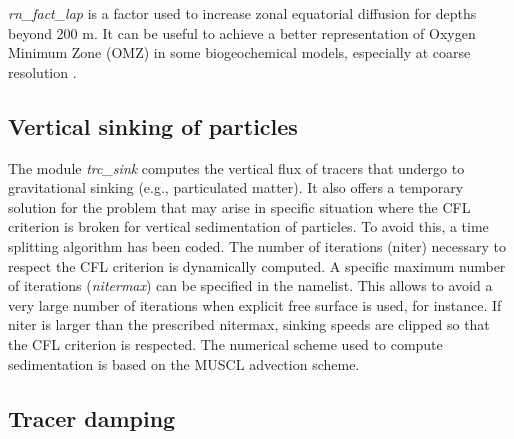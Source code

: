 \documentclass[../main/TOP_manual]{subfiles}
\begin{document}
\textit{rn\_fact\_lap} is a factor used to increase zonal equatorial diffusion for depths beyond 200 m. It can be useful to achieve a better representation of Oxygen Minimum Zone (OMZ) in some biogeochemical models, especially at coarse resolution \citep{getzlaff_2013}.



\subsection{Vertical sinking of particles}

The module \textit{trc\_sink} computes the vertical flux of tracers that undergo to gravitational sinking (e.g., particulated matter). It also offers a temporary solution for the problem that may arise in specific situation where the CFL criterion is broken for vertical sedimentation of particles. To avoid this, a time splitting algorithm has been coded. The number of iterations (niter) necessary to respect the CFL criterion is dynamically computed. A specific maximum number of iterations (\textit{nitermax}) can be specified in the namelist. This allows to avoid a very large number of iterations when explicit free surface is used, for instance. If niter is larger than the prescribed nitermax, sinking speeds are clipped so that the CFL criterion is respected. The numerical scheme used to compute sedimentation is based on the MUSCL advection scheme.


\subsection{Tracer damping}
\end{document}
